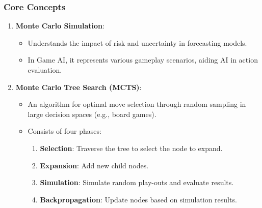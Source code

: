 \documentclass[aspectratio=169]{beamer}
\begin{document}
\begin{frame}[fragile]
  \frametitle{Core Concepts}
  \begin{enumerate}
    \item \textbf{Monte Carlo Simulation}:
      \begin{itemize}
        \item Understands the impact of risk and uncertainty in forecasting models.
        \item In Game AI, it represents various gameplay scenarios, aiding AI in action evaluation.
      \end{itemize}
      
    \item \textbf{Monte Carlo Tree Search (MCTS)}:
      \begin{itemize}
        \item An algorithm for optimal move selection through random sampling in large decision spaces (e.g., board games).
        \item Consists of four phases:
          \begin{enumerate}
            \item \textbf{Selection}: Traverse the tree to select the node to expand.
            \item \textbf{Expansion}: Add new child nodes.
            \item \textbf{Simulation}: Simulate random play-outs and evaluate results.
            \item \textbf{Backpropagation}: Update nodes based on simulation results.
          \end{enumerate}
        \end{itemize}
  \end{enumerate}
\end{frame}
\end{document}
